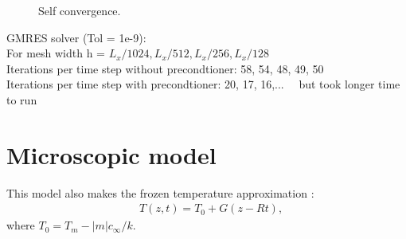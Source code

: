 \documentclass[a4paper,12pt]{article}
\begin{document}
\begin{figure}[!ht]
     \hfill
     \caption{Self convergence. }
     \label{fig:nolat_convergence}
   \end{figure}
GMRES solver (Tol = 1e-9):\\
For mesh width h =  $ L_x/1024, L_x/512, L_x/256, L_x/128 $\\
Iterations per time step without precondtioner: 58, 54, 48, 49, 50\\
Iterations per time step with precondtioner: 20, 17, 16,...      \ \        but took longer time to run

\newpage

\section{Microscopic model}


This model also makes the frozen temperature approximation \cite{Tourret2015,Echebarria2010,Plapp2007,Echebarria2004}:
\begin{align}
    & T(z,t) = T_0 + G(z-Rt),
\end{align}
where $T_0 = T_m - |m|c_{\infty}/k$. 
\end{document}
